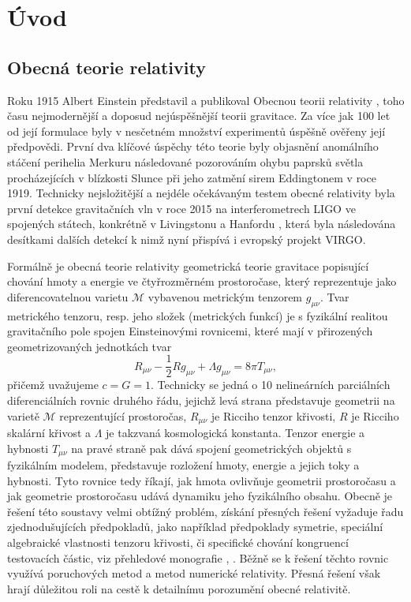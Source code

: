 \chapter*{Úvod}

\section*{Obecná teorie relativity}

Roku 1915 Albert Einstein představil a publikoval Obecnou teorii relativity \cite{Einstein1915}, toho času nejmodernější a doposud nejúspěšnější teorii gravitace. Za více jak 100 let od její formulace byly v nesčetném množství
experimentů úspěšně ověřeny její předpovědi. První dva klíčové úspěchy této teorie byly objasnění anomálního stáčení perihelia Merkuru následované pozorováním ohybu paprsků světla procházejících v blízkosti Slunce
při jeho zatmění sirem Eddingtonem v roce 1919.
Technicky nejsložitější a nejdéle očekávaným testem obecné relativity byla první detekce gravitačních vln v roce 2015 na interferometrech LIGO ve spojených státech, konkrétně v Livingstonu a Hanfordu \cite{PhysRevLett.116.061102}, která byla následována
desítkami dalších detekcí k nimž nyní přispívá i evropský projekt VIRGO.


Formálně je obecná teorie relativity geometrická teorie gravitace popisující chování hmoty a energie ve čtyřrozměrném prostoročase, který reprezentuje jako diferencovatelnou varietu $\mathcal{M}$ vybavenou metrickým tenzorem $g_{\mu \nu}$.
Tvar metrického tenzoru, resp. jeho složek (metrických funkcí) je s fyzikální realitou gravitačního pole spojen Einsteinovými rovnicemi, které mají v přirozených geometrizovaných jednotkách
tvar
\begin{equation}
    \label{eq:einsten_field_equations}
    R_{\mu \nu} - \frac{1}{2} R g_{\mu \nu} + \Lambda g_{\mu \nu} = 8 \pi T_{\mu \nu},
\end{equation}
přičemž uvažujeme $c = G = 1$.
Technicky se jedná o 10 nelineárních parciálních diferenciálních rovnic druhého řádu, jejichž levá strana představuje geometrii na varietě $\mathcal{M}$ reprezentující prostoročas, $R_{\mu \nu}$ je Ricciho tenzor křivosti, $R$ je Ricciho skalární křivost a $\Lambda$
je takzvaná kosmologická konstanta. Tenzor energie a hybnosti $T_{\mu \nu}$ na pravé straně pak dává spojení geometrických objektů s fyzikálním modelem, představuje rozložení hmoty,
energie a jejich toky a hybnosti. Tyto rovnice tedy říkají, jak hmota ovlivňuje geometrii prostoročasu a jak geometrie prostoročasu udává dynamiku jeho fyzikálního obsahu.
Obecně je řešení této soustavy velmi obtížný problém, získání přesných řešení vyžaduje řadu zjednodušujících předpokladů, jako například
předpoklady symetrie, speciální algebraické vlastnosti tenzoru křivosti, či specifické chování kongruencí testovacích částic, viz přehledové monografie \cite{griffiths_podolsky_2009}, \cite{stephani2003}. Běžně se k řešení těchto rovnic využívá poruchových metod a metod
numerické relativity. Přesná řešení však hrají důležitou roli na cestě k detailnímu porozumění obecné relativitě.


